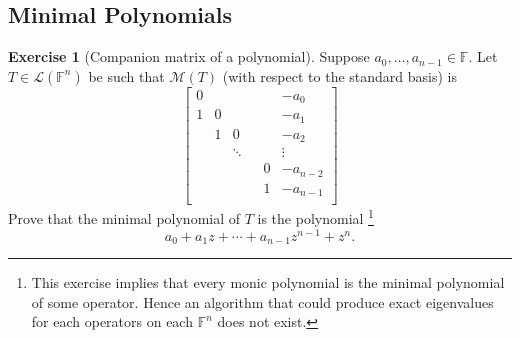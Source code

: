 \documentclass{tufte-handout}
\theoremstyle{plain} %
\newtheorem{prop}[thm]{Proposition}
\theoremstyle{definition}
\newtheorem{exer}[thm]{Exercise}
\theoremstyle{remark}
\newcommand{\F}{\mathbb{F}}
\renewcommand{\L}{\mathcal{L}}
\newcommand{\M}{\mathcal{M}}
\renewcommand{\P}{\mathcal{P}}
\begin{document}
\subsection{Minimal Polynomials}
\begin{exer}[Companion matrix of a polynomial]
	Suppose $a_0,\dots,a_{n-1}\in\F$. Let $T\in\L(\F^n)$ be such that $\M(T)$ (with respect to the standard basis) is
	\[\begin{bmatrix}
		0&&&&&-a_0\\
		1&0&&&&-a_1\\
		&1&0&&&-a_2\\
		&&\ddots&&&\vdots\\
		&&&&0&-a_{n-2}\\
		&&&&1&-a_{n-1}\\
	\end{bmatrix}\]
	Prove that the minimal polynomial of $T$ is the polynomial%
	\footnote{This exercise implies that every monic polynomial is the minimal polynomial of some operator. Hence an algorithm that could produce exact eigenvalues for each operators on each $\F^n$ does not exist.}
	\[a_0+a_1z+\cdots+a_{n-1}z^{n-1}+z^n.\]
\end{exer}

\end{document}
